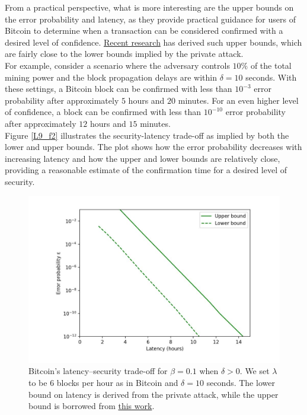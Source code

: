 From a practical perspective, what is more interesting are the upper bounds on the error probability and latency, as they provide practical guidance for users of Bitcoin to determine when a transaction can be considered confirmed with a desired level of confidence. \href{https://arxiv.org/pdf/2011.14051.pdf}{Recent research} has derived such upper bounds, which are fairly close to the lower bounds implied by the private attack.\\
For example, consider a scenario where the adversary controls $10\%$ of the total mining power and the block propagation delays are within $\delta = 10$ seconds. With these settings, a Bitcoin block can be confirmed with less than $10^{-3}$ error probability after approximately $5$ hours and $20$ minutes. For an even higher level of confidence, a block can be confirmed with less than $10^{-10}$ error probability after approximately $12$ hours and $15$ minutes.\\
Figure \ref{L9_f2} illustrates the security-latency trade-off as implied by both the lower and upper bounds. The plot shows how the error probability decreases with increasing latency and how the upper and lower bounds are relatively close, providing a reasonable estimate of the confirmation time for a desired level of security.
\begin{center}
	\begin{figure}
		\centering
		\includegraphics[width=0.8\linewidth]{Fig/09/F2}
		\caption{Bitcoin’s latency–security trade-oﬀ for $\beta = 0.1$ when $\delta > 0$. We set $\lambda$ to be $6$ blocks per hour as in Bitcoin and $\delta = 10$ seconds. The lower bound on latency is derived from the private attack, while the upper bound is borrowed from \href{https://arxiv.org/pdf/2011.14051.pdf}{this work}.}
		\label{fig:L9_f1}
	\end{figure}
\end{center}
